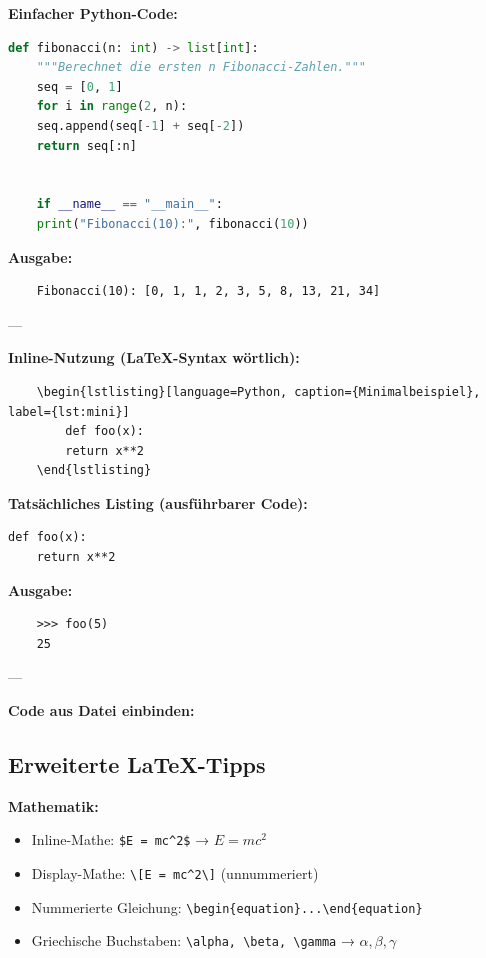 \documentclass[11pt,a4paper]{article}
\begin{document}
\textbf{Einfacher Python-Code:}

\begin{lstlisting}[language=Python, caption={Fibonacci-Beispiel}, label={lst:fib}]
    def fibonacci(n: int) -> list[int]:
    """Berechnet die ersten n Fibonacci-Zahlen."""
    seq = [0, 1]
    for i in range(2, n):
    seq.append(seq[-1] + seq[-2])
    return seq[:n]


    if __name__ == "__main__":
    print("Fibonacci(10):", fibonacci(10))
\end{lstlisting}

\textbf{Ausgabe:}
\begin{verbatim}
    Fibonacci(10): [0, 1, 1, 2, 3, 5, 8, 13, 21, 34]
\end{verbatim}

---

\textbf{Inline-Nutzung (LaTeX-Syntax wörtlich):}
\begin{verbatim}
    \begin{lstlisting}[language=Python, caption={Minimalbeispiel}, label={lst:mini}]
        def foo(x):
        return x**2
    \end{lstlisting}
\end{verbatim}

\textbf{Tatsächliches Listing (ausführbarer Code):}
\begin{lstlisting}[caption={Minimalbeispiel}, label={lst:mini}]
    def foo(x):
    return x**2
\end{lstlisting}

\textbf{Ausgabe:}
\begin{verbatim}
    >>> foo(5)
    25
\end{verbatim}

    ---

    \textbf{Code aus Datei einbinden:}
    \lstinline[language=TeX]||




    \subsection*{Erweiterte LaTeX-Tipps}

    \textbf{Mathematik:}
    \begin{itemize}
        \item Inline-Mathe: \verb|$E = mc^2$| → $E = mc^2$
        \item Display-Mathe: \verb|\[E = mc^2\]| (unnummeriert)
        \item Nummerierte Gleichung: \verb|\begin{equation}...\end{equation}|
        \item Griechische Buchstaben: \verb|\alpha, \beta, \gamma| → $\alpha, \beta, \gamma$
    \end{itemize}
\end{document}

